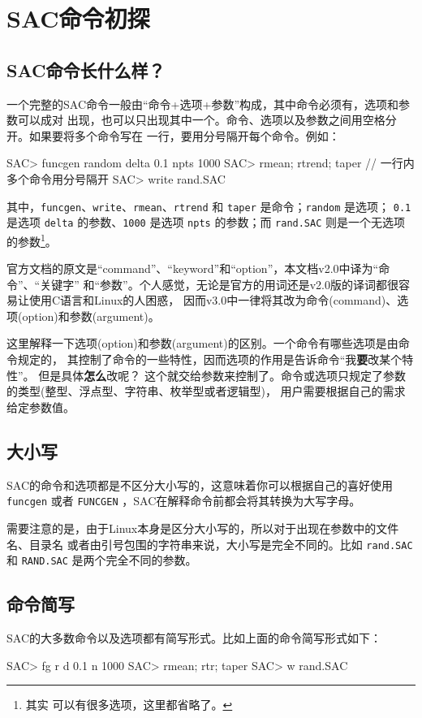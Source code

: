 \section{SAC命令初探}
\subsection{SAC命令长什么样？}
一个完整的SAC命令一般由``命令+选项+参数''构成，其中命令必须有，选项和参数可以成对
出现，也可以只出现其中一个。命令、选项以及参数之间用空格分开。如果要将多个命令写在
一行，要用分号隔开每个命令。例如：
\begin{SACCode}
SAC> funcgen random delta 0.1 npts 1000
SAC> rmean; rtrend; taper                 // 一行内多个命令用分号隔开
SAC> write rand.SAC
\end{SACCode}
其中，\texttt{funcgen}、\texttt{write}、\texttt{rmean}、\texttt{rtrend}
和 \texttt{taper} 是命令；\texttt{random} 是选项；
\texttt{0.1} 是选项 \texttt{delta} 的参数、\texttt{1000} 是选项
\texttt{npts} 的参数；而 \texttt{rand.SAC} 则是一个无选项的参数\footnote{其实
可以有很多选项，这里都省略了。}。

\begin{note}
官方文档的原文是“command”、“keyword”和“option”，本文档v2.0中译为“命令”、“关键字”
和“参数”。个人感觉，无论是官方的用词还是v2.0版的译词都很容易让使用C语言和Linux的人困惑，
因而v3.0中一律将其改为命令(command)、选项(option)和参数(argument)。

这里解释一下选项(option)和参数(argument)的区别。一个命令有哪些选项是由命令规定的，
其控制了命令的一些特性，因而选项的作用是告诉命令“我\textbf{要}改某个特性”。
但是具体\textbf{怎么}改呢？
这个就交给参数来控制了。命令或选项只规定了参数的类型(整型、浮点型、字符串、枚举型或者逻辑型)，
用户需要根据自己的需求给定参数值。
\end{note}

\subsection{大小写}
SAC的命令和选项都是不区分大小写的，这意味着你可以根据自己的喜好使用 \texttt{funcgen}
或者 \texttt{FUNCGEN} ，SAC在解释命令前都会将其转换为大写字母。

需要注意的是，由于Linux本身是区分大小写的，所以对于出现在参数中的文件名、目录名
或者由引号包围的字符串来说，大小写是完全不同的。比如 \texttt{rand.SAC} 和
\texttt{RAND.SAC} 是两个完全不同的参数。

\subsection{命令简写}
SAC的大多数命令以及选项都有简写形式。比如上面的命令简写形式如下：
\begin{SACCode}
SAC> fg r d 0.1 n 1000
SAC> rmean; rtr; taper
SAC> w rand.SAC
\end{SACCode}

